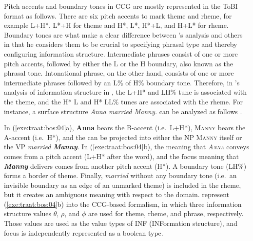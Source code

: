 \largerpage
Pitch accents and boundary tones in CCG are mostly represented in the
ToBI format as follows.  There are six pitch accents to mark theme and
rheme, for example L+H*, L*+H for theme and H*, L*, H*+L, and H+L* for
rheme. Boundary tones are what make a clear difference between
\citeauthor{steedman:00}'s analysis and others in that he considers
them to be crucial to specifying phrasal type and thereby configuring
information structure.  Intermediate phrases consist of one or more
pitch accents, followed by either the L or the H boundary, also known
as the phrasal tone. Intonational phrase, on the other hand, consists
of one or more intermediate phrases followed by an L\% of H\% boundary
tone. Therefore, in \citeauthor{steedman:00}'s analysis of information
structure in , the L+H* and LH\% tune is associated with
the theme, and the H* L and H* LL\% tunes are associated with the
rheme. For instance, a surface structure \textit{Anna married Manny.}
can be analyzed as follows \citep[302]{traat:bos:04}.





\noindent In (\ref{exe:traat:bos:04}a), \textbf{Anna} bears the
B-accent (i.e.\ L+H*), \textsc{Manny} bears the A-accent (i.e.\ H*),
and the  can be projected into either the NP \textsc{Manny}
itself or the VP \textit{married
  \textbf{Manny}}. In
(\ref{exe:traat:bos:04}b), the  meaning that
\textit{\textsc{Anna}} conveys comes from a pitch accent (L+H* after
the word), and the focus meaning that \textit{\textbf{Manny}} delivers
comes from another pitch accent (H*). A boundary tone (LH\%) forms a
border of theme. Finally, \textit{married} without any boundary tone
(i.e.\ an invisible boundary as an edge of an unmarked theme) is
included in the rheme, but it creates an ambiguous meaning with
respect to the  domain. \citet{traat:bos:04} represent
(\ref{exe:traat:bos:04}b) into the CCG-based formalism, in which three
information structure values \ensuremath{\theta}, \ensuremath{\rho},
and \ensuremath{\phi} are used for theme, rheme, and phrase,
respectively. Those values are used as the value types of INF
(INFormation structure), and focus is independently represented as a
boolean type.



